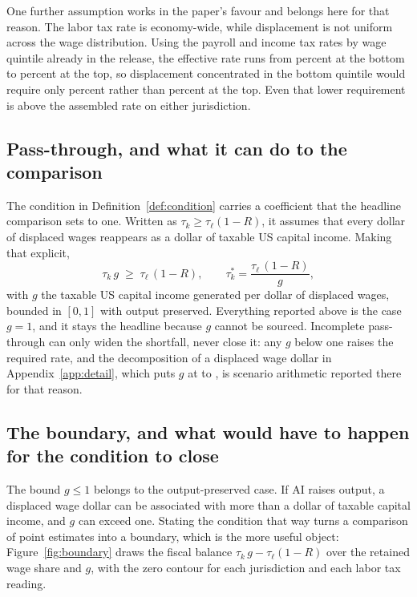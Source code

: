 One further assumption works in the paper's favour and belongs here for that reason. The labor
tax rate is economy-wide, while displacement is not uniform across the wage distribution. Using
the payroll and income tax rates by wage quintile already in the release, the effective rate runs
from  percent at the bottom to  percent
at the top, so displacement concentrated in the bottom quintile would require only
 percent rather than  percent at the
top. Even that lower requirement is above the assembled rate on either jurisdiction.

\subsection{Pass-through, and what it can do to the comparison}

The condition in Definition~\ref{def:condition} carries a coefficient that the headline comparison
sets to one. Written as $\tau_k \ge \tau_\ell (1 - R)$, it assumes that every dollar of displaced
wages reappears as a dollar of taxable US capital income. Making that explicit,
\begin{equation}
\tau_k \, g \;\ge\; \tau_\ell\,(1 - R), \qquad
\tau_k^{\ast} = \frac{\tau_\ell\,(1 - R)}{g},
\label{eq:passthrough}
\end{equation}
with $g$ the taxable US capital income generated per dollar of displaced wages, bounded in
$[0,1]$ with output preserved. Everything reported above is the case $g = 1$, and it stays the
headline because $g$ cannot be sourced. Incomplete pass-through can only widen the shortfall,
never close it: any $g$ below one raises the required rate, and the decomposition of a displaced
wage dollar in Appendix~\ref{app:detail}, which puts $g$ at  to , is
scenario arithmetic reported there for that reason.

\subsection{The boundary, and what would have to happen for the condition to close}

The bound $g \le 1$ belongs to the output-preserved case. If AI raises output, a displaced wage
dollar can be associated with more than a dollar of taxable capital income, and $g$ can exceed
one. Stating the condition that way turns a comparison of point estimates into a boundary, which
is the more useful object: Figure~\ref{fig:boundary} draws the fiscal balance
$\tau_k \, g - \tau_\ell (1 - R)$ over the retained wage share and $g$, with the zero contour for
each jurisdiction and each labor tax reading.

